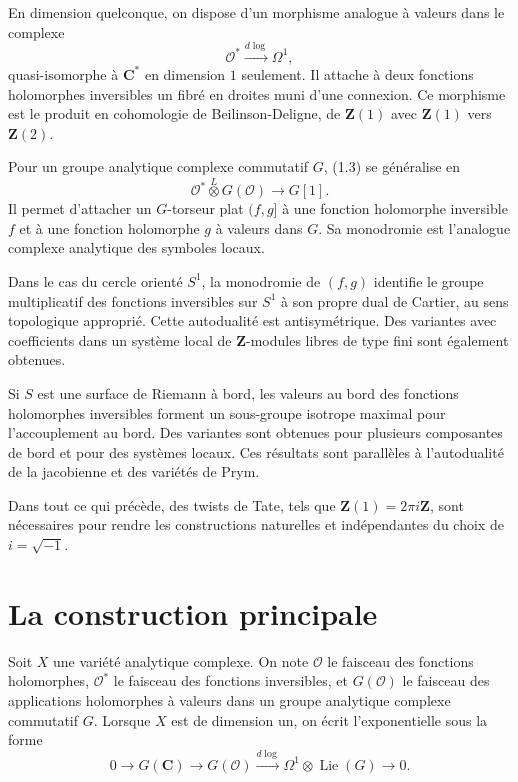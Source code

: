 \documentclass[11pt]{article}
\DeclareMathOperator{\Lie}{Lie}
\newcommand{\C}{\mathbf C}
\newcommand{\Z}{\mathbf Z}
\newcommand{\OO}{\mathcal O}
\begin{document}
En dimension quelconque, on dispose d'un morphisme analogue à valeurs dans le complexe
\[
 \OO^*\xrightarrow{d\log}\Omega^1,
\]
quasi-isomorphe à $\C^*$ en dimension $1$ seulement. Il attache à deux fonctions holomorphes inversibles un fibré en droites muni d'une connexion. Ce morphisme est le produit en cohomologie de Beilinson-Deligne, de $\Z(1)$ avec $\Z(1)$ vers $\Z(2)$.

Pour un groupe analytique complexe commutatif $G$, (1.3) se généralise en
\begin{equation}\tag{1.4}
 \OO^*\overset L\otimes G(\OO)\longrightarrow G[1].
\end{equation}
Il permet d'attacher un $G$-torseur plat $(f,g]$ à une fonction holomorphe inversible $f$ et à une fonction holomorphe $g$ à valeurs dans $G$. Sa monodromie est l'analogue complexe analytique des symboles locaux.

Dans le cas du cercle orienté $S^1$, la monodromie de $(f,g)$ identifie le groupe multiplicatif des fonctions inversibles sur $S^1$ à son propre dual de Cartier, au sens topologique approprié. Cette autodualité est antisymétrique. Des variantes avec coefficients dans un système local de $\Z$-modules libres de type fini sont également obtenues.

Si $S$ est une surface de Riemann à bord, les valeurs au bord des fonctions holomorphes inversibles forment un sous-groupe isotrope maximal pour l'accouplement au bord. Des variantes sont obtenues pour plusieurs composantes de bord et pour des systèmes locaux. Ces résultats sont parallèles à l'autodualité de la jacobienne et des variétés de Prym.

Dans tout ce qui précède, des twists de Tate, tels que $\Z(1)=2\pi i\Z$, sont nécessaires pour rendre les constructions naturelles et indépendantes du choix de $i=\sqrt{-1}$.

\section{La construction principale}

Soit $X$ une variété analytique complexe. On note $\OO$ le faisceau des fonctions holomorphes, $\OO^*$ le faisceau des fonctions inversibles, et $G(\OO)$ le faisceau des applications holomorphes à valeurs dans un groupe analytique complexe commutatif $G$. Lorsque $X$ est de dimension un, on écrit l'exponentielle sous la forme
\begin{equation}\tag{2.1.1}
 0\longrightarrow G(\C)\longrightarrow G(\OO)\xrightarrow{d\log}\Omega^1\otimes\Lie(G)\longrightarrow 0.
\end{equation}
\end{document}
